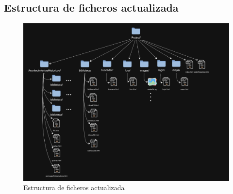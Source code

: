 \documentclass{article}
\begin{document}
\subsection{Estructura de ficheros actualizada}

\begin{figure}[H]
    \centering
    \includegraphics[width=\textwidth, height=0.8\textheight, keepaspectratio]{htmlFotos/estructuraFichero1.png}
    \caption{Estructura de ficheros actualizada}
    \label{fig:mapa_etiquetas_foro}
\end{figure}
\end{document}
